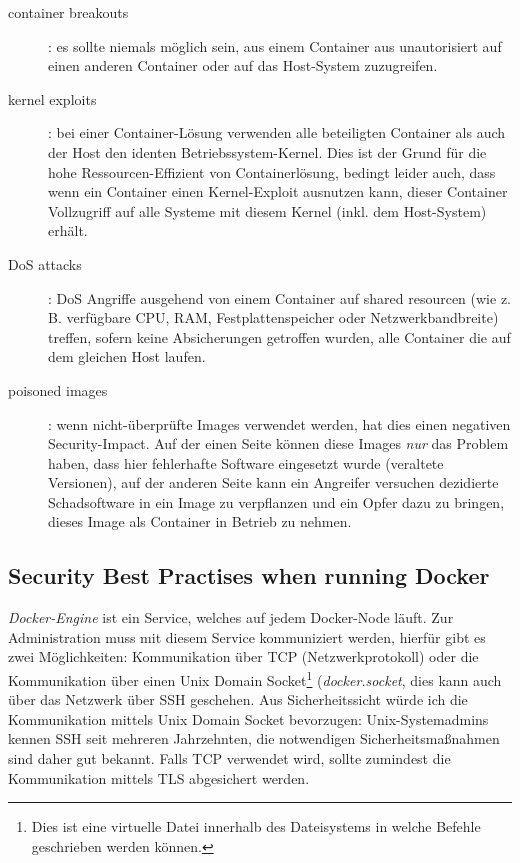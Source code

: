 \begin{description}
	\item[container breakouts]: es sollte niemals möglich sein, aus einem Container aus unautorisiert auf einen anderen Container oder auf das Host-System zuzugreifen.
	\item[kernel exploits]: bei einer Container-Lösung verwenden alle beteiligten Container als auch der Host den identen Betriebssystem-Kernel. Dies ist der Grund für die hohe Ressourcen-Effizient von Containerlösung, bedingt leider auch, dass wenn ein Container einen Kernel-Exploit ausnutzen kann, dieser Container Vollzugriff auf alle Systeme mit diesem Kernel (inkl. dem Host-System) erhält.
	\item[DoS attacks]: DoS Angriffe ausgehend von einem Container auf shared resourcen (wie z. B. verfügbare CPU, RAM, Festplattenspeicher oder Netzwerkbandbreite) treffen, sofern keine Absicherungen getroffen wurden, alle Container die auf dem gleichen Host laufen.
	\item[poisoned images]: wenn nicht-überprüfte Images verwendet werden, hat dies einen negativen Security-Impact. Auf der einen Seite können diese Images \textit{nur} das Problem haben, dass hier fehlerhafte Software eingesetzt wurde (veraltete Versionen), auf der anderen Seite kann ein Angreifer versuchen dezidierte Schadsoftware in ein Image zu verpflanzen und ein Opfer dazu zu bringen, dieses Image als Container in Betrieb zu nehmen.
\end{description}

\subsection{Security Best Practises when running Docker}

\textit{Docker-Engine} ist ein Service, welches auf jedem Docker-Node läuft. Zur Administration muss mit diesem Service kommuniziert werden, hierfür gibt es zwei Möglichkeiten: Kommunikation über TCP (Netzwerkprotokoll) oder die Kommunikation über einen Unix Domain Socket\footnote{Dies ist eine virtuelle Datei innerhalb des Dateisystems in welche Befehle geschrieben werden können.} (\textit{docker.socket}, dies kann auch über das Netzwerk über SSH geschehen. Aus Sicherheitssicht würde ich die Kommunikation mittels Unix Domain Socket bevorzugen: Unix-Systemadmins kennen SSH seit mehreren Jahrzehnten, die notwendigen Sicherheitsmaßnahmen sind daher gut bekannt. Falls TCP verwendet wird, sollte zumindest die Kommunikation mittels TLS abgesichert werden.

